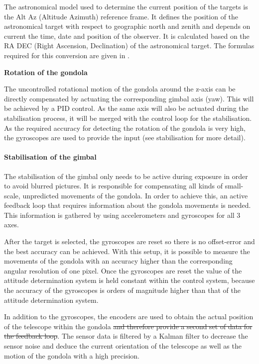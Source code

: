 The astronomical model used to determine the current position of the targets is the Alt Az (Altitude Azimuth) reference frame. It defines the position of the astronomical target with respect to geographic north and zenith and depends on current the time, date and position of the observer. It is calculated based on the RA DEC (Right Ascension, Declination) of the astronomical target. The formulas required for this conversion are given in \mbox{\cite{RaDec2AltAz}}.

\textbf{Rotation of the gondola}

The uncontrolled rotational motion of the gondola around the z-axis can be directly compensated by actuating the corresponding gimbal axis (yaw). This will be achieved by a PID control. As the same axis will also be actuated during the stabilisation process, it will be merged with the control loop for the stabilisation. As the required accuracy for detecting the rotation of the gondola is very high, the gyroscopes are used to provide the input (see stabilisation for more detail).



\paragraph{Stabilisation of the gimbal}
The stabilisation of the gimbal only needs to be active during exposure in order to avoid blurred pictures. It is responsible for compensating all kinds of small-scale, unpredicted movements of the gondola. In order to achieve this, an active feedback loop that requires information about the gondola movements is needed. This information is gathered by using accelerometers and gyroscopes for all 3 axes.

After the target is selected, the gyroscopes are reset so there is no offset-error and the best accuracy can be achieved. With this setup, it is possible to measure the movements of the gondola with an accuracy higher than the corresponding angular resolution of one pixel. Once the gyroscopes are reset the value of the attitude determination system is held constant within the control system, because the accuracy of the gyroscopes is orders of magnitude higher than that of the attitude determination system. 

In addition to the gyroscopes, the encoders are used to obtain the actual position of the telescope within the gondola\st{ and therefore provide a second set of data for the feedback loop}. The sensor data is filtered by a Kalman filter to decrease the sensor noise and deduce the current orientation of the telescope as well as the motion of the gondola with a high precision.

